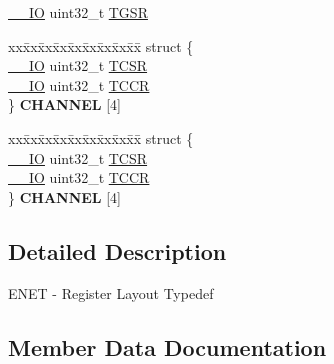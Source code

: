 \begin{DoxyCompactItemize}
\item 
\hyperlink{core__sc300_8h_aec43007d9998a0a0e01faede4133d6be}{\+\_\+\+\_\+\+IO} uint32\+\_\+t \hyperlink{structENET__Type_a272b70e137ff861d88e01ede575cbd82}{T\+G\+SR}
\item 
\begin{tabbing}
xx\=xx\=xx\=xx\=xx\=xx\=xx\=xx\=xx\=\kill
struct \{\\
\>\hyperlink{core__sc300_8h_aec43007d9998a0a0e01faede4133d6be}{\_\_IO} uint32\_t \hyperlink{structENET__Type_a344e4cceb1173e0a567e912c33b50b23}{TCSR}\\
\>\hyperlink{core__sc300_8h_aec43007d9998a0a0e01faede4133d6be}{\_\_IO} uint32\_t \hyperlink{structENET__Type_a0250ac5aaad7995bb08b2213c6e1719f}{TCCR}\\
\} {\bfseries CHANNEL} \mbox{[}4\mbox{]}\hypertarget{structENET__Type_a200ea2d3777304dfe26f843cc11f5068}{}\label{structENET__Type_a200ea2d3777304dfe26f843cc11f5068}
\\

\end{tabbing}\item 
\begin{tabbing}
xx\=xx\=xx\=xx\=xx\=xx\=xx\=xx\=xx\=\kill
struct \{\\
\>\hyperlink{core__sc300_8h_aec43007d9998a0a0e01faede4133d6be}{\_\_IO} uint32\_t \hyperlink{structENET__Type_a344e4cceb1173e0a567e912c33b50b23}{TCSR}\\
\>\hyperlink{core__sc300_8h_aec43007d9998a0a0e01faede4133d6be}{\_\_IO} uint32\_t \hyperlink{structENET__Type_a0250ac5aaad7995bb08b2213c6e1719f}{TCCR}\\
\} {\bfseries CHANNEL} \mbox{[}4\mbox{]}\hypertarget{structENET__Type_a837cf4521936a924472628dd73124c25}{}\label{structENET__Type_a837cf4521936a924472628dd73124c25}
\\

\end{tabbing}\end{DoxyCompactItemize}


\subsection{Detailed Description}
E\+N\+ET -\/ Register Layout Typedef 

\subsection{Member Data Documentation}
